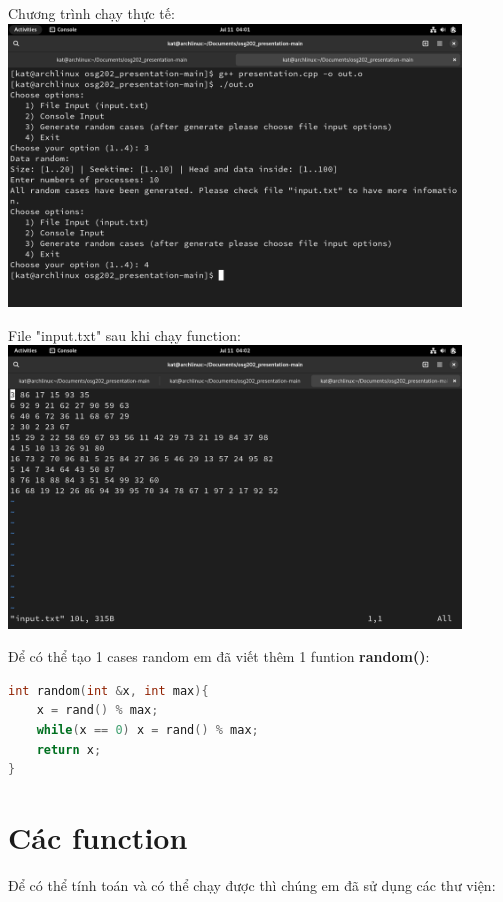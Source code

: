 \documentclass{report}
\begin{document}
            Chương trình chạy thực tế:\\
            \includegraphics[width = 12cm]{images/randomcases.png}

            File "input.txt" sau khi chạy function:\\
            \includegraphics[width = 12cm]{images/randominputtxt.png}

    Để có thể tạo 1 cases random em đã viết thêm 1 funtion \textbf{random()}:

            \begin{lstlisting}[language=C++, caption=Random Function]
int random(int &x, int max){
	x = rand() % max;
	while(x == 0) x = rand() % max;
	return x;
}    
            \end{lstlisting}

            

    \section{Các function}
        Để có thể tính toán và có thể chạy được thì chúng em đã sử dụng các thư viện:
\end{document}
